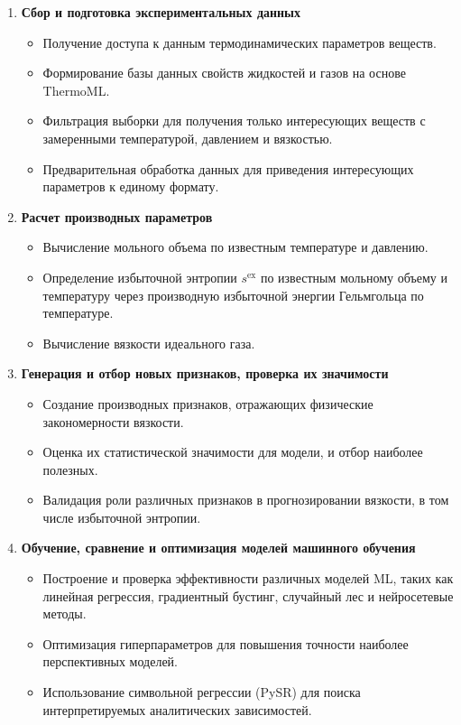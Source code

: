 \documentclass[a4paper,12pt]{article}
\begin{document}
    \begin{enumerate}
      \item \textbf{Сбор и подготовка экспериментальных данных}{
        \begin{itemize}
          \item Получение доступа к данным термодинамических параметров веществ.
          \item Формирование базы данных свойств жидкостей и газов на основе ThermoML.
          \item Фильтрация выборки для получения только интересующих веществ с замеренными температурой, давлением и вязкостью.
          \item Предварительная обработка данных для приведения интересующих параметров к единому формату.
        \end{itemize}
      }
    
        \item \textbf{Расчет производных параметров}
        \begin{itemize}
            \item Вычисление мольного объема по известным температуре и давлению.
            \item Определение избыточной энтропии $s^{\text{ex}}$ по известным мольному объему и температуру через производную избыточной энергии Гельмгольца по температуре.
            \item Вычисление вязкости идеального газа.
        \end{itemize}
    
        \item \textbf{Генерация и отбор новых признаков, проверка их значимости}
        \begin{itemize}
            \item Создание производных признаков, отражающих физические закономерности вязкости.
            \item Оценка их статистической значимости для модели, и отбор наиболее полезных.
            \item Валидация роли различных признаков в прогнозировании вязкости, в том числе избыточной энтропии.
        \end{itemize}
    
        \item \textbf{Обучение, сравнение и оптимизация моделей машинного обучения}
        \begin{itemize}
            \item Построение и проверка эффективности различных моделей ML, таких как линейная регрессия, градиентный бустинг, случайный лес и нейросетевые методы.
            \item Оптимизация гиперпараметров для повышения точности наиболее перспективных моделей.
            \item Использование символьной регрессии (PySR) для поиска интерпретируемых аналитических зависимостей.
        \end{itemize}
    

\end{enumerate}
\end{document}
